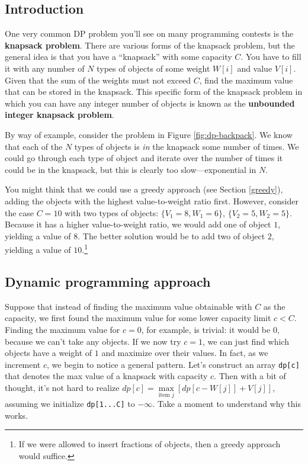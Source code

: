 \subsection{Introduction}

One very common DP problem you'll see on many programming contests is the \textbf{knapsack problem}.  There are various forms of the knapsack problem, but the general idea is that you have a ``knapsack'' with some capacity $C$.  You have to fill it with any number of $N$ types of objects of some weight $W[i]$ and value $V[i]$.  Given that the sum of the weights must not exceed $C$, find the maximum value that can be stored in the knapsack.  This specific form of the knapsack problem in which you can have any integer number of objects is known as the \textbf{unbounded integer knapsack problem}.

By way of example, consider the problem in Figure \ref{fig:dp-backpack}. We know that each of the $N$ types of objects is \textit{in} the knapsack some number of times.  We could go through each type of object and iterate over the number of times it could be in the knapsack, but this is clearly too slow---exponential in $N$.

You might think that we could use a greedy approach (see Section \ref{greedy}), adding the objects with the highest value-to-weight ratio first.  However, consider the case $C = 10$ with two types of objects: $\{V_1 = 8, W_1 = 6\}$, $\{V_2 = 5, W_2 = 5\}$.  Because it has a higher value-to-weight ratio, we would add one of object $1$, yielding a value of $8$. The better solution would be to add two of object $2$, yielding a value of $10$.\footnote{If we were allowed to insert fractions of objects, then a greedy approach would suffice.}


\subsection{Dynamic programming approach}

Suppose that instead of finding the maximum value obtainable with $C$ as the capacity, we first found the maximum value for some lower capacity limit $c < C$.  Finding the maximum value for $c=0$, for example, is trivial: it would be 0, because we can't take any objects.  If we now try $c=1$, we can just find which objects have a weight of $1$ and maximize over their values.  In fact, as we increment $c$, we begin to notice a general pattern.  Let's construct an array \verb=dp[c]= that denotes the max value of a knapsack with capacity $c$.  Then with a bit of thought, it's not hard to realize $dp[c] = \max\limits_{\text{item } j} \left[dp[c-W[j]]+V[j]\right]$, assuming we initialize \verb=dp[1...C]= to $-\infty$.  Take a moment to understand why this works.


